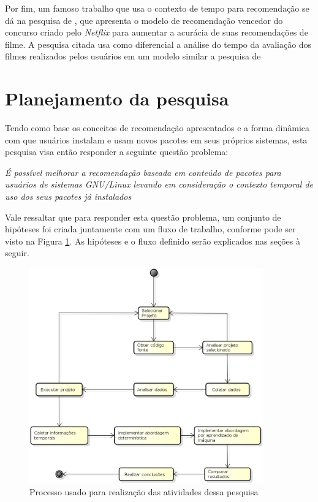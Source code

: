   Por fim, um famoso trabalho que usa o contexto de tempo para recomendação se dá na pesquisa de , que apresenta o modelo de recomendação
  vencedor do concurso criado pelo \textit{Netflix} para aumentar a acurácia de suas recomendações de filme. A pesquisa citada usa como diferencial a análise do tempo da avaliação
  dos filmes realizados pelos usuários em um modelo similar a pesquisa de 


  \section{Planejamento da pesquisa}

  Tendo como base os conceitos de recomendação apresentados e a forma dinâmica com
  que usuários instalam e usam novos pacotes em seus próprios sistemas, esta
  pesquisa visa então responder a seguinte questão problema:

  \begin{center}
  \textit{É possível melhorar a recomendação baseada em conteúdo de pacotes para
  usuários de sistemas GNU/Linux levando em consideração o contexto temporal de
  uso dos seus pacotes já instalados}
  \end{center}

  Vale ressaltar que para responder esta questão problema, um conjunto de
  hipóteses foi criada juntamente com um fluxo de trabalho, conforme pode ser visto na
  Figura \ref{fig:planejamento_pesquisa}. As hipóteses e o fluxo definido serão
  explicados nas seções à seguir.

  \begin{figure}[h]
    \centering
    \includegraphics[width=0.9\textwidth]{figuras/planejamento_pesquisa.eps}
    \caption{Processo usado para realização das atividades dessa pesquisa}
    \label{fig:planejamento_pesquisa}
  \end{figure}

